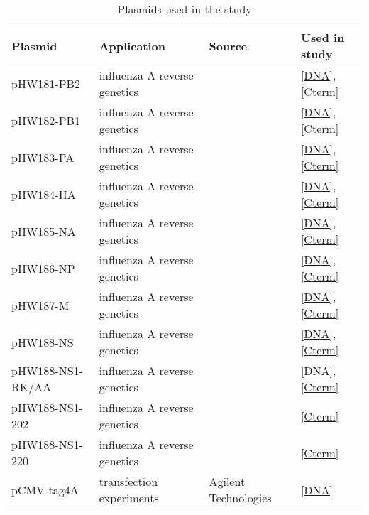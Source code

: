 		\begin{longtabu} to \linewidth {X[2,l] X[2,l] X[1.5,c] X[1,c]} 
		\caption{Plasmids used in the study} \label{tab:plasmids} \\
		
		\hline \textbf{Plasmid} & \textbf{Application} & \textbf{Source} & \textbf{Used in study} \\ 
		\endhead
		
		\hline pHW181-PB2 &  influenza A reverse genetics & \parencite{Hoffmann2000} &\ref*{DNA}, \ref{Cterm}  \\ 
		
		\hline pHW182-PB1 &  influenza A reverse genetics & \parencite{Hoffmann2000} &\ref*{DNA}, \ref{Cterm}  \\
		
		\hline pHW183-PA & influenza A reverse genetics & \parencite{Hoffmann2000} &\ref*{DNA}, \ref{Cterm}  \\
		
		\hline pHW184-HA &  influenza A reverse genetics & \parencite{Hoffmann2000} &\ref*{DNA}, \ref{Cterm}  \\
		
		\hline pHW185-NA &  influenza A reverse genetics & \parencite{Hoffmann2000} &\ref*{DNA}, \ref{Cterm}  \\
		
		\hline pHW186-NP &  influenza A reverse genetics & \parencite{Hoffmann2000} &\ref*{DNA}, \ref{Cterm}  \\
		
		\hline pHW187-M &  influenza A reverse genetics & \parencite{Hoffmann2000} &\ref*{DNA}, \ref{Cterm}  \\
		
		\hline pHW188-NS &  influenza A reverse genetics & \parencite{Hoffmann2000} &\ref*{DNA}, \ref{Cterm}  \\
		
		\hline pHW188-NS1-RK/AA &  influenza A reverse genetics & \parencite{Hoffmann2000} &\ref*{DNA}, \ref{Cterm} \\
		
		\hline pHW188-NS1-202 & influenza A reverse genetics & \parencite{Hoffmann2000} &\ref*{Cterm} \\
		
		\hline pHW188-NS1-220 &  influenza A reverse genetics & \parencite{Hoffmann2000} &\ref*{Cterm} \\
		
		\hline pCMV-tag4A & transfection experiments & Agilent Technologies &\ref*{DNA} \\ 
		

\end{longtabu}
